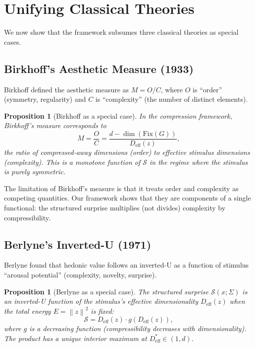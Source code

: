 \documentclass[journal]{IEEEtran}
\newtheorem{proposition}[theorem]{Proposition}
\newcommand{\norm}[1]{\left\lVert #1 \right\rVert}
\begin{document}
\section{Unifying Classical Theories}
\label{sec:unification}

We now show that the framework subsumes three classical theories as
special cases.

\subsection{Birkhoff's Aesthetic Measure (1933)}

Birkhoff defined the aesthetic measure as $M = O / C$, where $O$ is
``order'' (symmetry, regularity) and $C$ is ``complexity'' (the number
of distinct elements).

\begin{proposition}[Birkhoff as a special case]
\label{prop:birkhoff}
In the compression framework, Birkhoff's measure corresponds to
\begin{equation}
    M = \frac{O}{C} = \frac{d - \dim(\mathrm{Fix}(G))}
    {D_{\mathrm{eff}}(z)},
\end{equation}
the ratio of compressed-away dimensions (order) to effective
stimulus dimensions (complexity).  This is a monotone function of
$\mathcal{S}$ in the regime where the stimulus is purely symmetric.
\end{proposition}

The limitation of Birkhoff's measure is that it treats order and
complexity as competing quantities.  Our framework shows that they
are components of a single functional: the structured surprise
multiplies (not divides) complexity by compressibility.

\subsection{Berlyne's Inverted-U (1971)}

Berlyne found that hedonic value follows an inverted-U as a function
of stimulus ``arousal potential'' (complexity, novelty, surprise).

\begin{proposition}[Berlyne as a special case]
\label{prop:berlyne}
The structured surprise $\mathcal{S}(x; \Sigma)$ is an inverted-U
function of the stimulus's effective dimensionality $D_{\mathrm{eff}}(z)$
when the total energy $E = \norm{z}^2$ is fixed:
\begin{equation}
    \mathcal{S} = D_{\mathrm{eff}}(z) \cdot g(D_{\mathrm{eff}}(z)),
\end{equation}
where $g$ is a decreasing function (compressibility decreases with
dimensionality).  The product has a unique interior maximum at
$D_{\mathrm{eff}}^* \in (1, d)$.
\end{proposition}
\end{document}
